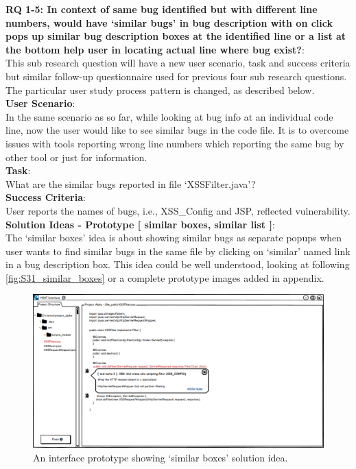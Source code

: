 \noindent \textbf{RQ 1-5: In context of same bug identified but with different line numbers, would have ‘similar bugs’ in bug description with on click pops up similar bug description boxes at the identified line or a list at the bottom help user in locating actual line where bug exist?}: \\


This sub research question will have a new user scenario, task and success criteria but similar follow-up questionnaire used for previous four sub research questions. The particular user study process pattern is changed, as described below. \\

\textbf{User Scenario}: \\

In the same scenario as so far, while looking at bug info at an individual code line, now the user would like to see similar bugs in the code file. It is to overcome issues with tools reporting wrong line numbers which reporting the same bug by other tool or just for information. \\



\textbf{Task}: \\

What are the similar bugs reported in file ‘XSSFilter.java’? \\

\textbf{Success Criteria}: \\

User reports the names of bugs, i.e., XSS\_Config and JSP, reflected vulnerability. \\


\textbf{Solution Ideas - Prototype [ similar boxes, similar list ]}: \\

The ‘similar boxes’ idea is about showing similar bugs as separate popups when user wants to find similar bugs in the same file by clicking on ‘similar’ named link in a bug description box. This idea could be well understood, looking at following \autoref{fig:S31_similar_boxes} or a complete prototype images added in appendix. \\

\begin{figure}[hbt!]
	\centering
	\includegraphics[width=\linewidth]{figures/solution_ideas_snaps/S31_similar_boxes}
	\caption{An interface prototype showing ‘similar boxes’ solution idea.}
	\label{fig:S31_similar_boxes}
\end{figure} 

